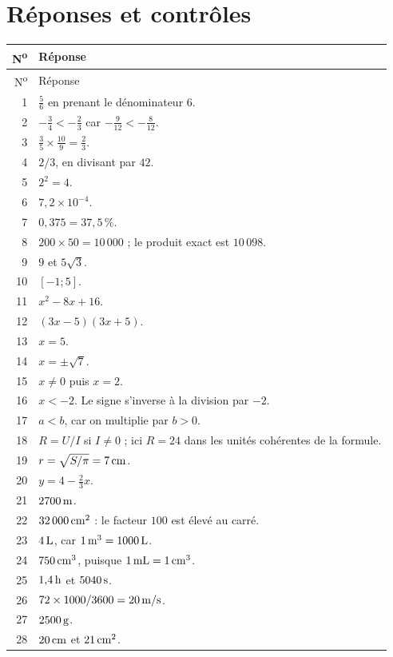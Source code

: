 \documentclass[11pt,a4paper,oneside]{book}
\begin{document}
\section{Réponses et contrôles}
\begin{longtable}{r p{}}
\toprule N\textsuperscript{o} & Réponse\\\midrule
\endfirsthead\toprule N\textsuperscript{o} & Réponse\\\midrule\endhead
1 & $\frac56$ en prenant le dénominateur $6$.\\
2 & $-\frac34<-\frac23$ car $-\frac9{12}<-\frac8{12}$.\\
3 & $\frac35\times\frac{10}{9}=\frac23$.\\
4 & $2/3$, en divisant par $42$.\\
5 & $2^2=4$.\\
6 & $7{,}2\times10^{-4}$.\\
7 & $0{,}375=37{,}5\,\%$.\\
8 & $200\times50=10\,000$ ; le produit exact est $10\,098$.\\
9 & $9$ et $5\sqrt3$.\\
10 & $[-1;5]$.\\
11 & $x^2-8x+16$.\\
12 & $(3x-5)(3x+5)$.\\
13 & $x=5$.\\
14 & $x=\pm\sqrt7$.\\
15 & $x\ne0$ puis $x=2$.\\
16 & $x<-2$. Le signe s'inverse à la division par $-2$.\\
17 & $a<b$, car on multiplie par $b>0$.\\
18 & $R=U/I$ si $I\ne0$ ; ici $R=24$ dans les unités cohérentes de la formule.\\
19 & $r=\sqrt{S/\pi}=7\,\mathrm{cm}$.\\
20 & $y=4-\frac23x$.\\
21 & $2700\,\mathrm{m}$.\\
22 & $32\,000\,\mathrm{cm^2}$ : le facteur $100$ est élevé au carré.\\
23 & $4\,\mathrm{L}$, car $1\,\mathrm{m^3}=1000\,\mathrm{L}$.\\
24 & $750\,\mathrm{cm^3}$, puisque $1\,\mathrm{mL}=1\,\mathrm{cm^3}$.\\
25 & $1{,}4\,\mathrm{h}$ et $5040\,\mathrm{s}$.\\
26 & $72\times1000/3600=20\,\mathrm{m/s}$.\\
27 & $2500\,\mathrm{g}$.\\
28 & $20\,\mathrm{cm}$ et $21\,\mathrm{cm^2}$.\\

\end{longtable}
\end{document}

